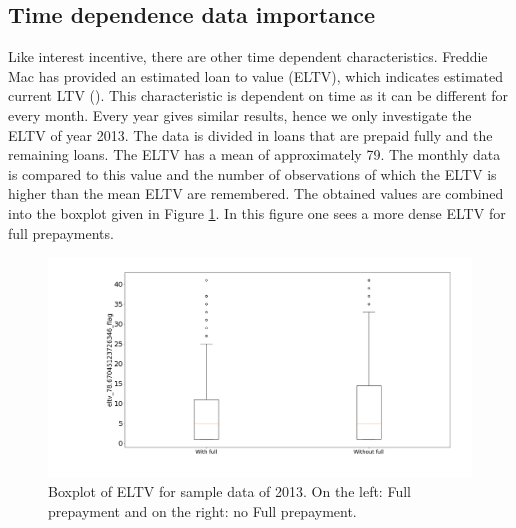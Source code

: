 \subsection{Time dependence data importance}
    Like interest incentive, there are other time
    dependent characteristics. Freddie Mac has
    provided an estimated loan to value (ELTV), which
    indicates estimated current LTV
    (\cite{FredieMac}). This characteristic is
    dependent on time as it can be different for every
    month. Every year gives similar results, hence we
    only investigate the ELTV of year 2013. The data
    is divided in loans that are prepaid fully and the
    remaining loans. The ELTV has a mean of
    approximately 79. The monthly data is compared to
    this value and the number of observations of which
    the ELTV is higher than the mean ELTV are
    remembered. The obtained values are combined into
    the boxplot given in Figure
    \ref{Model_boxplot_eltv_2013}. In this figure one sees a more dense ELTV for full prepayments. 
    
    \begin{figure}[H]
        \centering
        \includegraphics[width=\linewidth]{Latex/Report/Figures/eltv_2013.png}
        \caption{Boxplot of ELTV for sample data of 2013.  On the left: Full prepayment and on the right: no Full prepayment.}
        \label{Model_boxplot_eltv_2013}
    \end{figure}